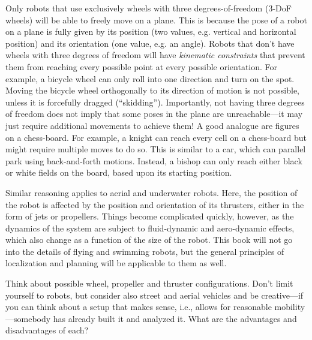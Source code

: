 Only robots that use exclusively wheels with three degrees-of-freedom ($3$-DoF wheels) will be able to freely move on a plane. This is because the pose of a robot on a plane is fully given by its position (two values, e.g. vertical and horizontal position) and its orientation (one value, e.g. an angle). Robots that don't have wheels with three degrees of freedom will have \textsl{kinematic constraints} that prevent them from reaching every possible point at every possible orientation. For example, a bicycle wheel can only roll into one direction and turn on the spot. Moving the bicycle wheel orthogonally to its direction of motion is not possible, unless it is forcefully dragged (``skidding''). Importantly, not having three degrees of freedom does not imply that some poses in the plane are unreachable---it may just require additional movements to achieve them!
A good analogue are figures on a chess-board. For example, a knight can reach every cell on a chess-board but might require multiple moves to do so. This is similar to a car, which can parallel park using back-and-forth motions. Instead, a bishop can only reach either black or white fields on the board, based upon its starting position.

Similar reasoning applies to aerial and underwater robots. Here, the position of the robot is affected by the position and orientation of its thrusters, either in the form of jets or propellers. Things become complicated quickly, however, as the dynamics of the system are subject to fluid-dynamic and aero-dynamic effects, which also change as a function of the size of the robot. This book will not go into the details of flying and swimming robots, but the general principles of localization and planning will be applicable to them as well.

\begin{mdframed} Think about possible wheel, propeller and thruster configurations. Don't limit yourself to robots, but consider also street and aerial vehicles and be creative---if you can think about a setup that makes sense, i.e., allows for reasonable mobility---somebody has already built it and analyzed it. What are the advantages and disadvantages of each?
\end{mdframed}

